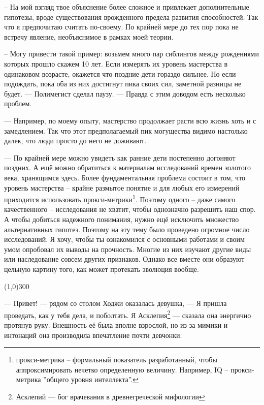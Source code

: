 \documentclass[12pt,a4paper]{article}
\newcommand{\sep}{
	\begin{center}
		\line(1,0){300}
	\end{center}
}
\begin{document}
-- На мой взгляд твое объяснение более сложное и привлекает дополнительные гипотезы, вроде существования врожденного предела развития способностей. Так что я предпочитаю считать по-своему. По крайней мере до тех пор пока не встречу явление, необъяснимое в рамках моей теории.

-- Могу привести такой пример: возьмем много пар сиблингов между рождениями которых прошло скажем 10 лет. Если измерять их уровень мастерства в одинаковом возрасте, окажется что поздние дети гораздо сильнее. Но если подождать, пока оба из них достигнут пика своих сил, заметной разницы не будет. --- Полимегист сделал паузу. --- Правда с этим доводом есть несколько проблем.

--- Например, по моему опыту, мастерство продолжает расти всю жизнь хоть и с замедлением. Так что этот предполагаемый пик могущества видимо настолько далек, что люди просто до него не доживают.

--- По крайней мере можно увидеть как ранние дети постепенно догоняют поздних. А ещё можно обратиться к материалам исследований времен золотого века, хранящимся здесь. Более фундаментальная проблема состоит в том, что уровень мастерства -- крайне размытое понятие и для любых его измерений приходится использовать прокси-метрики\footnote{прокси-метрика -- формальный показатель разработанный, чтобы аппроксимировать нечетко определенную величину. Например, IQ -- прокси-метрика ''общего уровня интеллекта''.}. Поэтому одного -- даже самого качественного -- исследования не хватит, чтобы однозначно разрешить наш спор. А чтобы добиться надежного понимания, нужно ещё исключить множество альтернативных гипотез. Поэтому на эту тему было проведено огромное число исследований. Я хочу, чтобы ты ознакомился с основными работами и своим умом опробовал их выводы на прочность. Многие из них изучают другие виды или наследование совсем других признаков. Однако все вместе они образуют цельную картину того, как может протекать эволюция вообще.





\sep

--- Привет! --- рядом со столом Ходжи оказалась девушка, --- Я пришла проведать, как у тебя дела, и поболтать. Я Асклепия\footnote{Асклепий --- бог врачевания в древнегреческой мифологии} --- сказала она энергично протянув руку. Внешность её была вполне взрослой, но из-за мимики и интонаций она производила впечатление почти девчонки.
\end{document}
